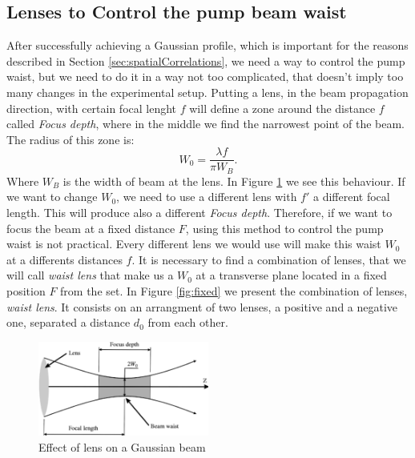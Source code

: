 \subsection{Lenses to Control the pump beam waist}

After successfully achieving a Gaussian profile, which is important for the reasons 
described in Section \ref{sec:spatialCorrelations}, we need a way to control the pump waist, 
but we need to do it 
in a way not too complicated, that doesn't imply too many changes in the experimental setup.
 Putting a  lens, in the beam propagation direction, with certain focal lenght $f$ will define
 a zone around the distance $f$ called \textit{Focus depth}\cite{hecht}, where in the middle 
we find the narrowest point of the beam. The radius of this zone is:
\begin{equation}
 W_0=\frac{\lambda f}{\pi W_B}.
\end{equation}
Where $W_B$ is the width of beam at the lens. In Figure \ref{fig:waist} we see this 
behaviour.  If we want to change $W_0$, we need to use a different lens with $f'$ a different
focal length. This will produce also a different \textit{Focus depth}. Therefore, 
if we want to focus the beam at a fixed distance $F$, using this method to control the pump
 waist is not practical. Every different lens we would use will make this waist $W_0$ at a
 differents distances $f$. It is necessary to find a combination of lenses, that we will call
\textit{waist lens} that make us a 
$W_0$ at a transverse plane located in a fixed position $F$ from the set. 
In Figure \ref{fig:fixed} we present the combination of lenses, \textit{waist lens}.
 It consists on an arrangment of two 
lenses, a positive and a negative one, separated a distance $d_0$ from each other.
\begin{figure}[h!]
\centering
\includegraphics[width=0.5\textwidth]{Figures/waist.png}
\caption{Effect of lens on a Gaussian beam\cite{hecht}} 
\label{fig:waist}
\end{figure}


